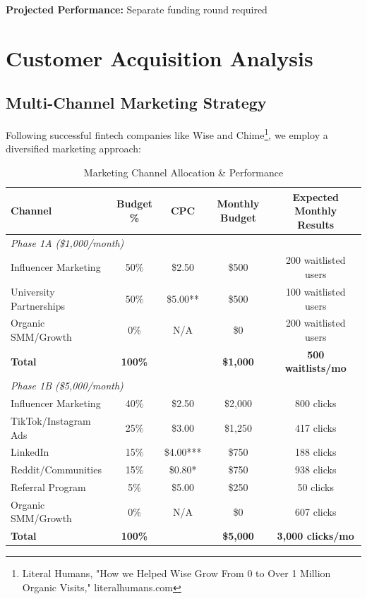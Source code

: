 \documentclass[11pt,letterpaper]{article}
\begin{document}
\textbf{Projected Performance:} Separate funding round required

\newpage

\section{Customer Acquisition Analysis}

\subsection{Multi-Channel Marketing Strategy}

Following successful fintech companies like Wise and Chime\footnote{Literal Humans, "How we Helped Wise Grow From 0 to Over 1 Million Organic Visits," literalhumans.com}, we employ a diversified marketing approach:

\begin{table}[h]
\centering
\caption{Marketing Channel Allocation \& Performance}
\begin{tabular}{|l|c|c|c|c|}
\hline
\textbf{Channel} & \textbf{Budget \%} & \textbf{CPC} & \textbf{Monthly Budget} & \textbf{Expected Monthly Results} \\
\hline
\multicolumn{5}{|l|}{\textit{Phase 1A (\$1,000/month)}} \\
\hline
Influencer Marketing & 50\%& \$2.50& \$500& 200 waitlisted users\\
University Partnerships & 50\%& \$5.00**& \$500& 100 waitlisted users\\
Organic SMM/Growth & 0\% & N/A & \$0 & 200 waitlisted users\\
\hline
\textbf{Total} & \textbf{100\%} & & \textbf{\$1,000} & \textbf{500 waitlists/mo} \\
\hline
\multicolumn{5}{|l|}{\textit{Phase 1B (\$5,000/month)}} \\
\hline
Influencer Marketing & 40\%& \$2.50& \$2,000& 800 clicks\\
TikTok/Instagram Ads & 25\%& \$3.00 & \$1,250& 417 clicks\\
LinkedIn & 15\%& \$4.00*** & \$750 & 188 clicks\\
Reddit/Communities & 15\%& \$0.80* & \$750& 938 clicks\\
Referral Program & 5\%& \$5.00 & \$250& 50 clicks\\
Organic SMM/Growth & 0\% & N/A & \$0 & 607 clicks\\
\hline
\textbf{Total} & \textbf{100\%} & & \textbf{\$5,000} & \textbf{3,000 clicks/mo} \\
\hline
\end{tabular}
\end{table}
\end{document}
